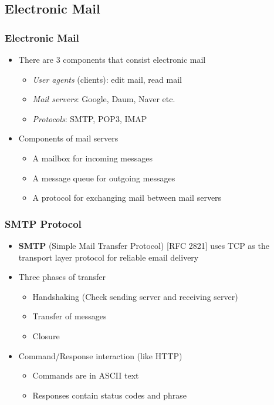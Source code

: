 \subsection{Electronic Mail}
\subsubsection{Electronic Mail}
\begin{itemize}
	\item There are 3 components that consist electronic mail
	\begin{itemize}
		\item \textit{User agents} (clients): edit mail, read mail
		\item \textit{Mail servers}: Google, Daum, Naver etc.
		\item \textit{Protocols}: SMTP, POP3, IMAP
	\end{itemize}
	\item Components of mail servers
	\begin{itemize}
		\item A mailbox for incoming messages
		\item A message queue for outgoing messages
		\item A protocol for exchanging mail between mail servers
	\end{itemize}
\end{itemize}

\subsubsection{SMTP Protocol}
\begin{itemize}
	\item \textbf{SMTP} (Simple Mail Transfer Protocol) [RFC 2821] uses TCP as the transport layer protocol for reliable email delivery
	\item Three phases of transfer
	\begin{itemize}
		\item Handshaking (Check sending server and receiving server)
		\item Transfer of messages
		\item Closure
	\end{itemize}
	\item Command/Response interaction (like HTTP)
	\begin{itemize}
		\item Commands are in ASCII text
		\item Responses contain status codes and phrase
	\end{itemize}
\end{itemize}

